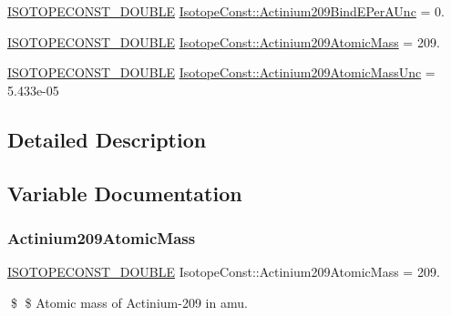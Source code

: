 \begin{DoxyCompactItemize}
\mbox{\hyperlink{group___isotope_const-_macros_ga8f45a7272ce02c0b4c65c44636ed719a}{I\+S\+O\+T\+O\+P\+E\+C\+O\+N\+S\+T\+\_\+\+D\+O\+U\+B\+LE}} \mbox{\hyperlink{group___isotope_const-_actinium-_ac209_ga866e6023e0ca45c304a60635c2a6dafc}{Isotope\+Const\+::\+Actinium209\+Bind\+E\+Per\+A\+Unc}} = 0.
\item 
\mbox{\hyperlink{group___isotope_const-_macros_ga8f45a7272ce02c0b4c65c44636ed719a}{I\+S\+O\+T\+O\+P\+E\+C\+O\+N\+S\+T\+\_\+\+D\+O\+U\+B\+LE}} \mbox{\hyperlink{group___isotope_const-_actinium-_ac209_ga8fee370e072be94e42dff54fcf473f18}{Isotope\+Const\+::\+Actinium209\+Atomic\+Mass}} = 209.
\item 
\mbox{\hyperlink{group___isotope_const-_macros_ga8f45a7272ce02c0b4c65c44636ed719a}{I\+S\+O\+T\+O\+P\+E\+C\+O\+N\+S\+T\+\_\+\+D\+O\+U\+B\+LE}} \mbox{\hyperlink{group___isotope_const-_actinium-_ac209_ga8e9672e7d1c560a3f83a65917603f2ff}{Isotope\+Const\+::\+Actinium209\+Atomic\+Mass\+Unc}} = 5.\+433e-\/05
\end{DoxyCompactItemize}


\subsection{Detailed Description}


\subsection{Variable Documentation}
\mbox{\label{group___isotope_const-_actinium-_ac209_ga8fee370e072be94e42dff54fcf473f18}} 
\subsubsection{\texorpdfstring{Actinium209\+Atomic\+Mass}{Actinium209AtomicMass}}
{\footnotesize\ttfamily \mbox{\hyperlink{group___isotope_const-_macros_ga8f45a7272ce02c0b4c65c44636ed719a}{I\+S\+O\+T\+O\+P\+E\+C\+O\+N\+S\+T\+\_\+\+D\+O\+U\+B\+LE}} Isotope\+Const\+::\+Actinium209\+Atomic\+Mass = 209.}

\$ \$ Atomic mass of Actinium-\/209 in amu. \mbox{\label{group___isotope_const-_actinium-_ac209_ga8e9672e7d1c560a3f83a65917603f2ff}} 
